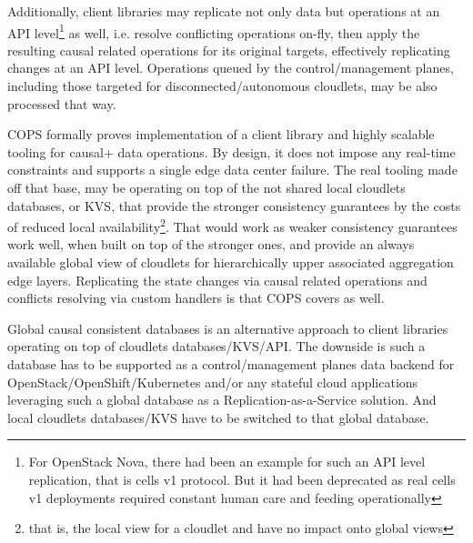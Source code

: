 \documentclass[conference]{IEEEtran}
\begin{document}
Additionally, client libraries may replicate not only data but operations at an
API level\footnote{For OpenStack Nova, there had been an example for such an
API level replication, that is cells v1 protocol. But it had been deprecated as
real cells v1 deployments required constant human care and feeding
operationally} as well, i.e. resolve conflicting operations on-fly, then apply
the resulting causal related operations for its original targets, effectively
replicating changes at an API level. Operations queued by the control/management planes, including
those targeted for disconnected/autonomous cloudlets, may be also processed
that way.

COPS formally proves implementation of a client library and highly scalable
tooling for causal+ data operations. By design, it does not impose any
real-time constraints and supports a single edge data center failure. The real
tooling made off that base, may be operating on top of the not shared local
cloudlets databases, or KVS, that provide the stronger consistency guarantees
by the costs of reduced local availability\footnote{that is, the local view for
a cloudlet and have no impact onto global views}. That would work as weaker
consistency guarantees work well, when built on top of the stronger ones, and
provide an always available global view of cloudlets for hierarchically
upper associated aggregation edge layers. Replicating the state changes via
causal related operations and conflicts resolving via custom handlers is that
COPS covers as well.

Global causal consistent databases\cite{b6} is an alternative approach to
client libraries operating on top of cloudlets databases/KVS/API. The downside
is such a database has to be supported as a control/management planes data
backend for OpenStack/OpenShift/Kubernetes and/or any stateful cloud
applications leveraging such a global database as a Replication-as-a-Service
solution. And local cloudlets databases/KVS have to be switched to that global
database.
\end{document}
